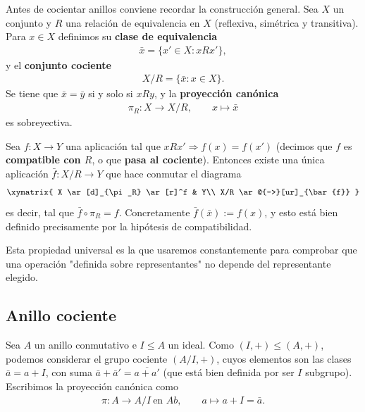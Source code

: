 Antes de cocientar anillos conviene recordar la construcción general. Sea $X$ un conjunto y $R$ una relación de equivalencia en $X$ (reflexiva, simétrica y transitiva). Para $x\in X$ definimos su \textbf{clase de equivalencia}
\begin{gather*}
    \bar{x} = \{x'\in X : xRx'\},
\end{gather*}
y el \textbf{conjunto cociente}
\begin{gather*}
    X/R = \{\bar{x} : x\in X\}.
\end{gather*}
Se tiene que $\bar x = \bar y$ si y solo si $xRy$, y la \textbf{proyección canónica}
\begin{gather*}
    \pi_R:X \to X/R, \qquad x\mapsto \bar x
\end{gather*}
es sobreyectiva.

\begin{prop}\label{prop:universal-cociente}
Sea $f:X\to Y$ una aplicación tal que $xRx' \Rightarrow f(x)=f(x')$ (decimos que $f$ es \textbf{compatible con $R$}, o que \textbf{pasa al cociente}). Entonces existe una única aplicación $\bar f: X/R \to Y$ que hace conmutar el diagrama
\begin{gather*}
    \xymatrix{
        X \ar[d]_{\pi_R} \ar[r]^f & Y\\
        X/R \ar@{-->}[ur]_{\bar{f}}
    }
\end{gather*}
es decir, tal que $\bar f \circ \pi_R = f$. Concretamente $\bar f(\bar x) := f(x)$, y esto está bien definido precisamente por la hipótesis de compatibilidad.
\end{prop}

Esta propiedad universal es la que usaremos constantemente para comprobar que una operación "definida sobre representantes" no depende del representante elegido.

\subsection{Anillo cociente}

Sea $A$ un anillo conmutativo e $I\leq A$ un ideal. Como $(I,+)\leq (A,+)$, podemos considerar el grupo cociente $(A/I,+)$, cuyos elementos son las clases $\bar a = a+I$, con suma $\bar a + \bar a' = \overline{a+a'}$ (que está bien definida por ser $I$ subgrupo). Escribimos la proyección canónica como
\begin{gather*}
    \pi: A \to A/I \ \text{en } Ab, \qquad a\mapsto a+I=\bar a.
\end{gather*}

